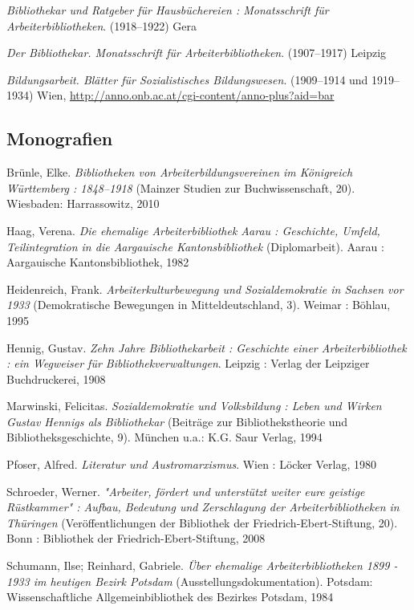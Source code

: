 \documentclass[a4paper,
fontsize=11pt,
oneside,
numbers=noperiodatend,
parskip=half-,
bibliography=totoc,
final
]{scrartcl}
\begin{document}
\emph{Bibliothekar und Ratgeber für Hausbüchereien : Monatsschrift für
Arbeiterbibliotheken}. (1918--1922) Gera

\emph{Der Bibliothekar. Monatsschrift für Arbeiterbibliotheken}.
(1907--1917) Leipzig

\emph{Bildungsarbeit. Blätter für Sozialistisches Bildungswesen}.
(1909--1914 und 1919--1934) Wien,
\url{http://anno.onb.ac.at/cgi-content/anno-plus?aid=bar}

\hypertarget{monografien}{%
\subsection*{Monografien}\label{monografien}}

Brünle, Elke. \emph{Bibliotheken von Arbeiterbildungsvereinen im
Königreich Württemberg : 1848--1918} (Mainzer Studien zur
Buchwissenschaft, 20). Wiesbaden: Harrassowitz, 2010

Haag, Verena. \emph{Die ehemalige Arbeiterbibliothek Aarau : Geschichte,
Umfeld, Teilintegration in die Aargauische Kantonsbibliothek}
(Diplomarbeit). Aarau : Aargauische Kantonsbibliothek, 1982

Heidenreich, Frank. \emph{Arbeiterkulturbewegung und Sozialdemokratie in
Sachsen vor 1933} (Demokratische Bewegungen in Mitteldeutschland, 3).
Weimar : Böhlau, 1995

Hennig, Gustav. \emph{Zehn Jahre Bibliothekarbeit : Geschichte einer
Arbeiterbibliothek : ein Wegweiser für Bibliothekverwaltungen}. Leipzig
: Verlag der Leipziger Buchdruckerei, 1908

Marwinski, Felicitas. \emph{Sozialdemokratie und Volksbildung : Leben
und Wirken Gustav Hennigs als Bibliothekar} (Beiträge zur
Bibliothekstheorie und Bibliotheksgeschichte, 9). München u.a.: K.G.
Saur Verlag, 1994

Pfoser, Alfred. \emph{Literatur und Austromarxismus}. Wien : Löcker
Verlag, 1980

Schroeder, Werner. \emph{"Arbeiter, fördert und unterstützt weiter eure
geistige Rüstkammer" : Aufbau, Bedeutung und Zerschlagung der
Arbeiterbibliotheken in Thüringen} (Veröffentlichungen der Bibliothek
der Friedrich-Ebert-Stiftung, 20). Bonn : Bibliothek der
Friedrich-Ebert-Stiftung, 2008

Schumann, Ilse; Reinhard, Gabriele. \emph{Über ehemalige
Arbeiterbibliotheken 1899 - 1933 im heutigen Bezirk Potsdam}
(Ausstellungsdokumentation). Potsdam: Wissenschaftliche
Allgemeinbibliothek des Bezirkes Potsdam, 1984
\end{document}
